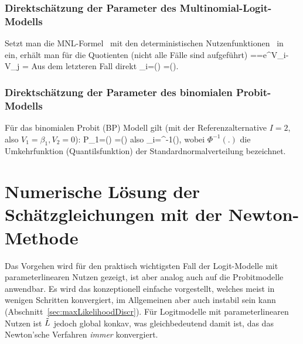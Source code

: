 \subsubsection*{Direktsch\"atzung der Parameter des Multinomial-Logit-Modells}
Setzt man die MNL-Formel~ mit den deterministischen
Nutzenfunktionen~ in~ ein, erh\"alt
man f\"ur die Quotienten (nicht alle F\"alle sind aufgef\"uhrt)
\bdm
{}==e^{V_i-V_j}
=
\edm
Aus dem letzteren Fall direkt
\be
\label{kalib-konst-MNL}
\beta_i=\ln\left(\right)
 =\ln\left(\right).
\ee

\subsubsection*{Direktsch\"atzung der Parameter des binomialen
  Probit-Modells}

F\"ur das binomialen
  Probit (BP) Modell gilt (mit der Referenzalternative $I=2$, also
  $V_1=\beta_1, V_2=0$): 
\bdm
P_1=\Phi\left(\right)
=\Phi\left(\right)
\edm
also
\be
\label{kalib-konst-BP}
\beta_i=\Phi^{-1}\left(\right),
\ee
wobei $\Phi^{-1}(.)$ die Umkehrfunktion (Quantilsfunktion) der
Standardnormalverteilung bezeichnet.


\section{\label{sec:discrAusw}Numerische L\"osung der
Sch\"atzgleichungen mit der Newton-Methode}
Das Vorgehen wird f\"ur den praktisch wichtigsten Fall der
Logit-Modelle mit parameterlinearen Nutzen 
gezeigt, ist aber analog auch auf die Probitmodelle
anwendbar. Es wird das konzeptionell einfache 
 vorgestellt, welches meist in
 wenigen Schritten konvergiert, im Allgemeinen aber auch instabil
 sein kann (Abschnitt~\ref{sec:maxLikelihoodDiscr}). 
F\"ur Logitmodelle mit parameterlinearen Nutzen ist
 $\tilde{L}$ jedoch global konkav, was gleichbedeutend damit ist, das das
 Newton'sche Verfahren \emph{immer} konvergiert.


